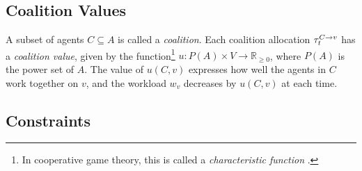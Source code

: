 \subsection{Coalition Values}\label{sec:cv}

A subset of agents $C \subseteq A$ is called a \emph{coalition}. Each coalition
allocation $\tau^{C \rightarrow v}_{t}$ has a \emph{coalition value}, given by the function\footnote{In
cooperative game theory, this is called a \emph{characteristic function} \cite[Section
$2.1$]{chalkiadakis2011}.} $u : P(A) \times V \rightarrow \mathbb{R}_{\geq 0}$, where
$P(A)$ is the power set of $A$.
The value of $u(C, v)$ expresses how well the agents in $C$ work together on $v$, and the
workload $w_v$ decreases by $u(C, v)$ at each time.
\iffalse
Coalitions need not to be super-additive. Tasks are heterogeneous, in the sense that
they may have different workloads and deadlines.
\fi

\subsection{Constraints}\label{sec:constraints}

